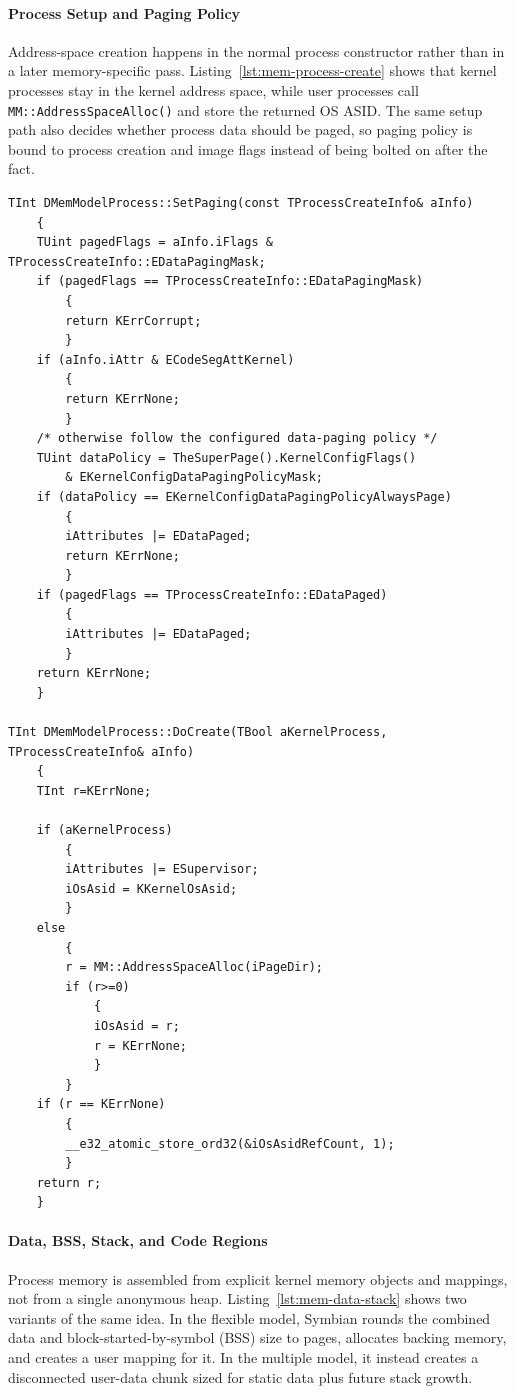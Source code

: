 \paragraph{Process Setup and Paging Policy}

Address-space creation happens in the normal process constructor rather than in
a later memory-specific pass. Listing~\ref{lst:mem-process-create} shows that
kernel processes stay in the kernel address space, while user processes call
\texttt{MM::AddressSpaceAlloc()} and store the returned OS ASID. The same setup
path also decides whether process data should be paged, so paging policy is
bound to process creation and image flags instead of being bolted on after the
fact.

\begin{listing}[H]
\begin{verbatim}
TInt DMemModelProcess::SetPaging(const TProcessCreateInfo& aInfo)
	{
	TUint pagedFlags = aInfo.iFlags & TProcessCreateInfo::EDataPagingMask;
	if (pagedFlags == TProcessCreateInfo::EDataPagingMask)
		{
		return KErrCorrupt;
		}
	if (aInfo.iAttr & ECodeSegAttKernel)
		{
		return KErrNone;
		}
	/* otherwise follow the configured data-paging policy */
	TUint dataPolicy = TheSuperPage().KernelConfigFlags()
		& EKernelConfigDataPagingPolicyMask;
	if (dataPolicy == EKernelConfigDataPagingPolicyAlwaysPage)
		{
		iAttributes |= EDataPaged;
		return KErrNone;
		}
	if (pagedFlags == TProcessCreateInfo::EDataPaged)
		{
		iAttributes |= EDataPaged;
		}
	return KErrNone;
	}

TInt DMemModelProcess::DoCreate(TBool aKernelProcess, TProcessCreateInfo& aInfo)
	{
	TInt r=KErrNone;

	if (aKernelProcess)
		{
		iAttributes |= ESupervisor;
		iOsAsid = KKernelOsAsid;
		}
	else
		{
		r = MM::AddressSpaceAlloc(iPageDir);
		if (r>=0)
			{
			iOsAsid = r;
			r = KErrNone;
			}
		}
	if (r == KErrNone)
		{
		__e32_atomic_store_ord32(&iOsAsidRefCount, 1);
		}
	return r;
	}
\end{verbatim}
\caption{Process address-space allocation and data-paging policy. File:
\texttt{flexible/mprocess.cpp}.}
\label{lst:mem-process-create}
\end{listing}

\paragraph{Data, BSS, Stack, and Code Regions}

Process memory is assembled from explicit kernel memory objects and mappings,
not from a single anonymous heap. Listing~\ref{lst:mem-data-stack} shows two
variants of the same idea. In the flexible model, Symbian rounds the combined
data and block-started-by-symbol (BSS) size to pages, allocates backing memory,
and creates a user mapping for it. In the multiple model, it instead creates a
disconnected user-data chunk sized for static data plus future stack growth.

